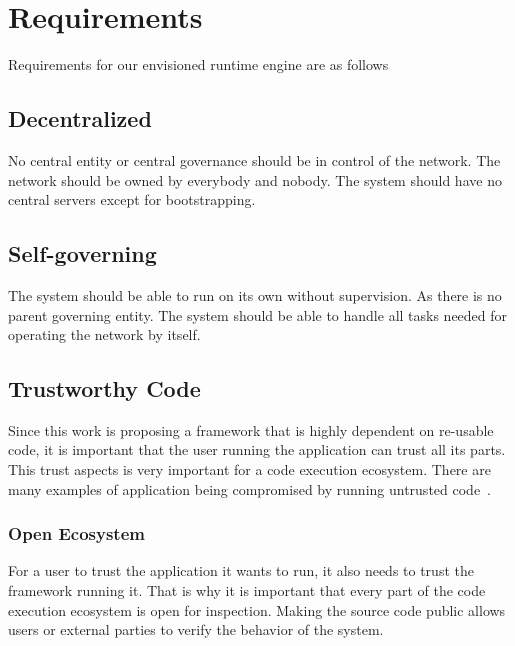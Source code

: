 \section{Requirements}

Requirements for our envisioned runtime engine are as follows

\subsection{Decentralized}
No central entity or central governance should be in control of the network. The network should be owned by everybody and nobody. The system should have no central servers except for bootstrapping. 

\subsection{Self-governing}
The system should be able to run on its own without supervision. As there is no parent governing entity. The system should be able to handle all tasks needed for operating the network by itself.

\subsection{Trustworthy Code}


Since this work is proposing a framework that is highly dependent on re-usable code, it is important that the user running the application can trust all its parts. This trust aspects is very important for a code execution ecosystem. There are many examples of application being compromised by running untrusted code~\cite{purescript}\cite{docker}.

\subsubsection{\textbf{Open Ecosystem}}
For a user to trust the application it wants to run, it also needs to trust the framework running it. That is why it is important that every part of the code execution ecosystem is open for inspection. Making the source code public allows users or external parties to verify the behavior of the system. 

